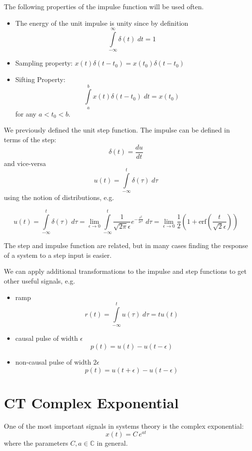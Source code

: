 The following properties of the impulse function will be used often.

\begin{itemize}
\item The energy of the unit impulse is unity since by definition
  \[
  \int\limits_{-\infty}^{\infty} \delta(t) \; dt = 1
  \]
\item Sampling property: $x(t)\delta(t-t_0) = x(t_0)\delta(t-t_0)$
\item Sifting Property:
  \[
  \int\limits_{a}^{b} x(t)\delta(t-t_0) \; dt = x(t_0)
  \]
  for any $a < t_0 < b$.
\end{itemize}

We previously defined the unit step function. The impulse can be defined in terms of the step:
\[
\delta(t) = \frac{du}{dt}
\]
and vice-versa
\[
u(t) = \int\limits_{-\infty}^{t} \delta(\tau) \; d\tau
\]
using the notion of distributions, e.g.

\[
u(t) = \int\limits_{-\infty}^{t} \delta(\tau) \; d\tau = \lim_{\epsilon \rightarrow 0} \int\limits_{-\infty}^{t} \frac{1}{\sqrt{2\pi}\epsilon} e^{-\frac{\tau^2}{2\epsilon^2}} \; d\tau = \lim_{\epsilon \rightarrow 0} \frac{1}{2}\left(1+\text{erf}\left( \frac{t}{\sqrt{2}\epsilon}\right)\right)
\]

The step and impulse function are related, but in many cases finding the response of a system to a step input is easier.

We can apply additional transformations to the impulse and step functions to get other useful signals, e.g.

\begin{itemize}
\item ramp
  \[
  r(t) = \int\limits_{-\infty}^{t} u(\tau) \; d\tau = tu(t)
  \]
  
\item causal pulse of width $\epsilon$
  \[
  p(t) = u(t) - u(t-\epsilon)
  \]
  
\item non-causal pulse of width $2\epsilon$
  \[
      p(t) = u(t+\epsilon) - u(t-\epsilon)
      \]
\end{itemize}

\section{CT Complex Exponential}

One of the most important signals in systems theory is the complex exponential:
\[
x(t) = C\, e^{a t}
\]
where the parameters $C, a \in \mathbb{C}$ in general.

